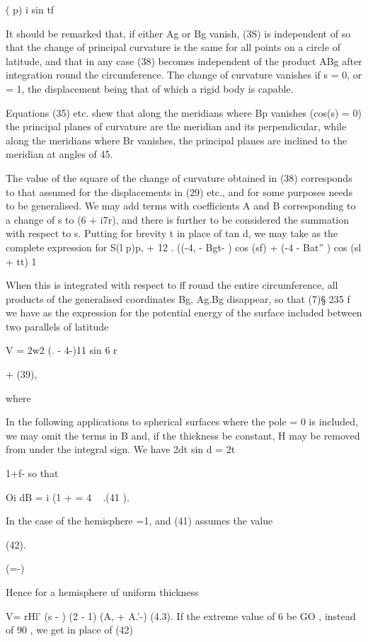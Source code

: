 ( p)  i sin tf

It should be remarked that, if either Ag or Bg vanish, (3S) is independent of
so that the change of principal curvature is the same for all points on a
circle of latitude, and that in any case (38) becomes independent of the
product ABg after integration round the circumference. The change of curvature
vanishes if s = 0, or  = 1, the displacement being that of which a rigid body
is capable.

Equations (35) etc. shew that along the meridians where Bp vanishes (cos(s) = 0)
the principal planes of curvature are the
meridian and its perpendicular, while along the meridians where Br vanishes,
the principal planes are inclined to the meridian at angles of 45.

The value of the square of the change of curvature obtained in (38) corresponds
to that assumed for the displacements in (29) etc., and for some purposes
needs to be generalised. We may add terms with coefficients A and B
corresponding to a change of s to (6  + i7r), and there is further to be
considered the summation with respect to s. Putting for brevity t in place of
tan d, we may take as the complete expression for S(l p)p, + 12  .  ((-4, -
Bgt- ) cos (sf) + (-4  - Bat'' ) cos (sl + tt) 1

When this is integrated with respect to ff round the entire circumference, all
products of the generalised coordinates Bg, Ag.Bg disappear,
so that (7)§ 235 f
we have as the expression for the potential energy of the surface included
between two parallels of latitude

V = 2w2 (. - 4-)11 sin 6 r

+ (39),

where

In the following applications to spherical surfaces where the pole  = 0 is
included, we may omit the terms in B and, if the thickness be constant, H may
be removed from under the integral sign. We have 2dt sin d = 2t

1+f- so that

Oi dB = i (1 + = 4 ~ .(41 ).

In the case of the hemisphere =1, and (41) assumes the value

(42).

 (=-)

Hence for a hemisphere uf uniform thickness

V= rHl' (s - ) (2 - 1) (A, + A.'-) (4.3).  If the extreme value of 6 be GO ,
instead of 90 , we get in place of (42)

